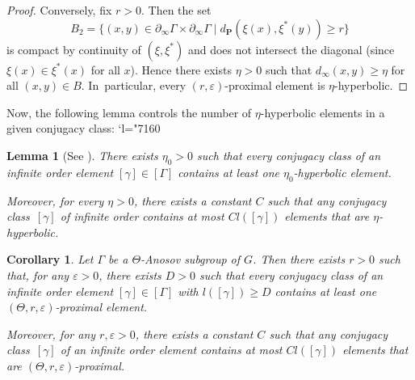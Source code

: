 \documentclass[11pt]{article}
\numberwithin{equation}{section}
\newcommand{\Changel}{\mathcode`l="7160}
\newtheorem{coro}[theo]{Corollary}
\newtheorem{lemma}[theo]{Lemma}
\theoremstyle{definition}
\newcommand{\proj}{\mathbf{P}}
\let\epsilon\varepsilon
\let\G\Gamma
\let\g\gamma
\begin{document}
\begin{proof}
Conversely, fix $r>0$. Then the set
\[
B_2 = \{(x,y)\in \partial_\infty \Gamma \times \partial_\infty \Gamma \mid d_\proj(\xi(x),\xi^*(y)) \geq r\}
\]
is compact by continuity of $(\xi,\xi^*)$ and does not intersect the diagonal (since $\xi(x)\in \xi^*(x)$ for all $x$). Hence there exists $\eta>0$ such that $d_\infty(x,y)\geq \eta$ for all $(x,y)\in B$. In~particular, every $(r,\epsilon)$-proximal element is $\eta$-hyperbolic.
\end{proof}

Now, the following lemma controls the number of $\eta$-hyperbolic elements in a given conjugacy class:
\Changel

\begin{lemma}[See {\cite[\S 7]{CK}}] \label{lem - HyperbolicConjugacies}
There exists $\eta_0>0$ such that every conjugacy class of an infinite order element $[\g]\in [\G]$ contains at least one $\eta_0$-hyperbolic element.

Moreover, for every $\eta>0$, there exists a constant $C$ such that any conjugacy class~$[\g]$ of infinite order contains at most $C l([\g])$ elements that are $\eta$-hyperbolic.
\end{lemma}

\begin{coro} \label{lem - ProximalConjugacyClass}
Let $\Gamma$ be a $\Theta$-Anosov subgroup of $G$. Then there exists $r>0$ such that, for any $\epsilon>0$, there exists $D>0$ such that every conjugacy class of an infinite order element $[\g]\in [\Gamma]$ with $l([\g]) \geq D$ contains at least one $(\Theta,r,\epsilon)$-proximal element.

Moreover, for any $r,\epsilon>0$, there exists a constant $C$ such that any conjugacy class~$[\g]$ of an infinite order element contains at most $C l([\g])$ elements that are $(\Theta,r,\epsilon)$\nobreakdash-prox\-imal.
\end{coro}
\end{document}
